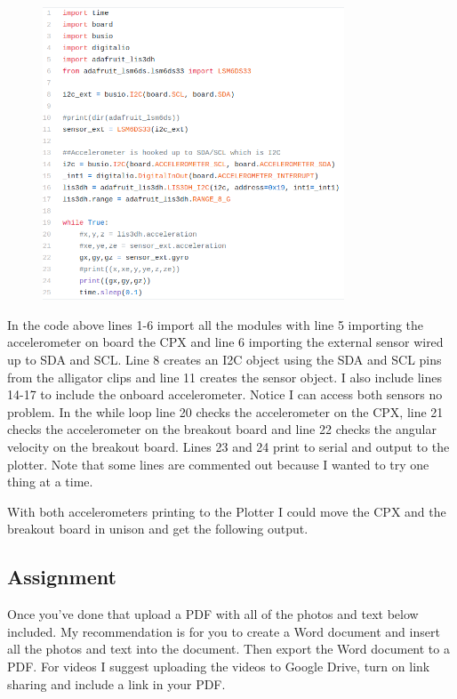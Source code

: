 \begin{figure}[H]
  \begin{center}
    \includegraphics[width=0.8\textwidth]{Figures/imu_code.png}
  \end{center}
\end{figure}
In the code above lines 1-6 import all the modules with line 5 importing the accelerometer on board the CPX and line 6 importing the external sensor wired up to SDA and SCL. Line 8 creates an I2C object using the SDA and SCL pins from the alligator clips and line 11 creates the sensor object. I also include lines 14-17 to include the onboard accelerometer. Notice I can access both sensors no problem. In the while loop line 20 checks the accelerometer on the CPX, line 21 checks the accelerometer on the breakout board and line 22 checks the angular velocity on the breakout board. Lines 23 and 24 print to serial and output to the plotter. Note that some lines are commented out because I wanted to try one thing at a time.

With both accelerometers printing to the Plotter I could move the CPX and the breakout board in unison and get the following output.


\subsection{Assignment}

Once you've done that upload a PDF with all of the photos and text below included. My recommendation is for you to create a Word document and insert all the photos and text into the document. Then export the Word document to a PDF. For videos I suggest uploading the videos to Google Drive, turn on link sharing and include a link in your PDF.

